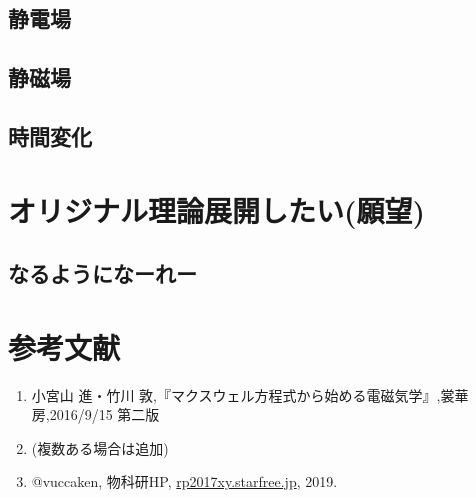 \documentclass[11pt,b5paper,papersize,dvipdfmx]{jsarticle}
\begin{document}
\subsection{静電場}
\subsection{静磁場}
\subsection{時間変化}
\subsection{}

\section{オリジナル理論展開したい(願望)}
\subsection{なるようになーれー}

\section{参考文献}
\renewcommand{\labelenumi}{[\arabic{enumi}]} %
\begin{enumerate}
\item 小宮山 進・竹川 敦,『マクスウェル方程式から始める電磁気学』,裳華房,2016/9/15 第二版
\item (複数ある場合は追加)
\item @vuccaken, 物科研HP, \url{rp2017xy.starfree.jp}, 2019.
\end{enumerate}
\renewcommand{\labelenumi}{\arabic{enumi}.} %
\end{document}
